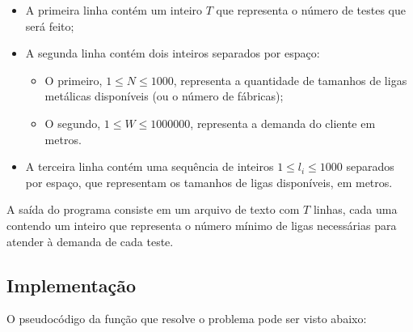\documentclass[12pt]{article}
\begin{document}
	\begin{itemize}
		\item A primeira linha contém um inteiro $T$ que representa o número de testes que será feito;
		\item A segunda linha contém dois inteiros separados por espaço:
		\begin{itemize}
			\item O primeiro, $1 \leq N \leq 1000$, representa a quantidade de tamanhos de ligas metálicas disponíveis (ou o número de fábricas);
			\item O segundo, $1 \leq W \leq 1000000$, representa a demanda do cliente em metros.
		\end{itemize}
		
		\item A terceira linha contém uma sequência de inteiros $1 \leq l_i \leq 1000$ separados por espaço, que representam os tamanhos de ligas disponíveis, em metros.
	\end{itemize}

	\par A saída do programa consiste em um arquivo de texto com $T$ linhas, cada uma contendo um inteiro que representa o número mínimo de ligas necessárias para atender à demanda de cada teste.

	\subsection*{Implementação}
	\label{sec:implementacao}

		\par O pseudocódigo da função que resolve o problema pode ser visto abaixo:
		
\end{document}
